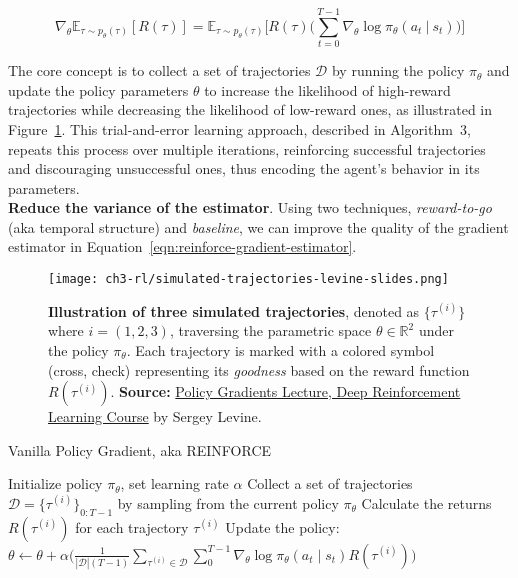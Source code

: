 \begin{equation}\label{eqn:reinforce-gradient-estimator}
    \nabla_{\theta}\mathbb{E}_{\tau\sim p_{\theta}(\tau)}[R(\tau)] = \mathbb{E}_{\tau\sim p_{\theta}(\tau)}\bigg[R(\tau)\bigg(\sum_{t=0}^{T-1} \nabla_{\theta}\log \pi_{\theta} (a_t~|~s_t) \bigg)\bigg] 
\end{equation}

\noindent The core concept is to collect a set of trajectories $\mathcal{D}$ 
by running the policy $\pi_{\theta}$ and update the policy parameters $\theta$ to increase the likelihood of high-reward trajectories while decreasing the likelihood of low-reward ones, as illustrated in Figure~\ref{fig:anatomy-rl-trajectories}. This trial-and-error learning approach, described in Algorithm~3, repeats this process over multiple iterations, reinforcing successful trajectories and discouraging unsuccessful ones, thus encoding the agent's behavior in its parameters. \\

\noindent \textbf{Reduce the variance of the estimator}. Using two techniques,
\textit{reward-to-go} (aka temporal structure) and \textit{baseline}, we can improve the quality of the gradient estimator in Equation~\ref{eqn:reinforce-gradient-estimator}. 

\begin{figure}[ht]
    \centering
    \texttt{[image: ch3-rl/simulated-trajectories-levine-slides.png]}
    \captionsetup{width=\textwidth} %
    \caption{\textbf{Illustration of three simulated trajectories}, denoted as $\{\tau^{(i)}\}$ where $i=(1,2,3)$, traversing the parametric space $\theta\in\mathbb{R}^2$ under the policy $\pi_{\theta}$. Each trajectory is marked with a colored symbol (cross, check) representing its \textit{goodness} based on the reward function $R(\tau^{(i)})$. \textbf{Source:} \href{https://rail.eecs.berkeley.edu/deeprlcourse/}{Policy Gradients Lecture, Deep Reinforcement Learning Course} by Sergey Levine.}
    \label{fig:anatomy-rl-trajectories}
  \end{figure}
  
\begin{algorithm}
    \caption{Vanilla Policy Gradient, aka REINFORCE}
    \begin{algorithmic}
    \STATE Initialize policy $\pi_{\theta}$, set learning rate $\alpha$
        \STATE Collect a set of trajectories $\mathcal{D}=\{\tau^{(i)}\}_{0:T-1}$ by sampling from the current policy $\pi_{\theta}$
        \STATE Calculate the returns $R(\tau^{(i)})$ for each trajectory $\tau^{(i)}$
        \STATE Update the policy: $\theta \leftarrow \theta + \alpha \bigg(\frac{1}{|\mathcal{D}|(T-1)}\sum_{\tau^{(i)}\in\mathcal{D}}\sum_{0}^{T-1}\nabla_{\theta}\log\pi_{\theta}(a_{t}\mid s_{t})R(\tau^{(i)})\bigg)$
    \ENDFOR
    \end{algorithmic}
\end{algorithm}

